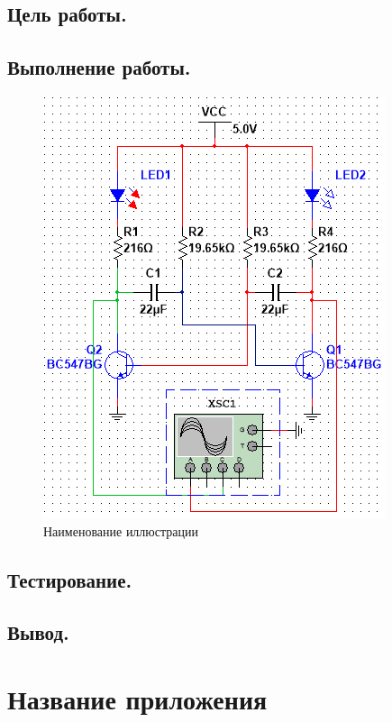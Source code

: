 

\newcommand{\subject}{Название дисциплины}
\newcommand{\labnumber}{1}
\newcommand{\teacher}{Петров~П.П.}
\newcommand{\theme}{Название темы}
\newcommand{\name}{Иванов~И.И.}





\setcounter{page}{2}

\subsection*{Цель работы.}

\subsection*{Выполнение работы.}

\begin{figure}[h!]
	\centering
	\includegraphics[width=0.7\linewidth]{images/image}
	\caption{Наименование иллюстрации}
	\label{fig:image}
\end{figure}


\subsection*{Тестирование.}

\subsection*{Вывод.}

\newpage
\section{Название приложения}


